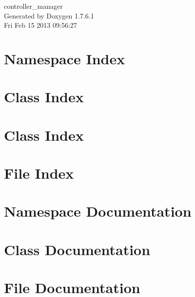 \documentclass[a4paper]{book}
\begin{document}
\begin{titlepage}
\vspace*{7cm}
\begin{center}
{\Large controller\-\_\-manager }\\
\vspace*{1cm}
{\large \-Generated by Doxygen 1.7.6.1}\\
\vspace*{0.5cm}
{\small Fri Feb 15 2013 09:56:27}\\
\end{center}
\end{titlepage}
\clearemptydoublepage
{}
\tableofcontents
\clearemptydoublepage
{}
\chapter{\-Namespace \-Index}

\chapter{\-Class \-Index}

\chapter{\-Class \-Index}

\chapter{\-File \-Index}

\chapter{\-Namespace \-Documentation}



\chapter{\-Class \-Documentation}




\chapter{\-File \-Documentation}







\printindex
\end{document}
